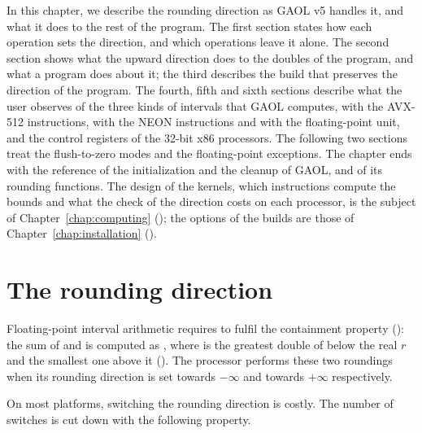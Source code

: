 \documentclass[12pt,a4paper,twoside,openright]{book}
\begin{document}
\medskip
In this chapter, we describe the rounding direction as GAOL v5 handles it,
and what it does to the rest of the program. The first section states how
each operation sets the direction, and which operations leave it alone. The
second section shows what the upward direction does to the doubles of the
program, and what a program does about it; the third describes the build that
preserves the direction of the program. The fourth, fifth and sixth sections
describe what the user observes of the three kinds of intervals that GAOL
computes, with the AVX-512 instructions, with the NEON instructions and with
the floating-point unit, and the control registers of the 32-bit x86
processors. The following two sections treat the flush-to-zero modes and the
floating-point exceptions. The chapter ends with the reference of the
initialization and the cleanup of GAOL, and of its rounding functions. The
design of the kernels, which instructions compute the bounds and what the
check of the direction costs on each processor, is the subject of
Chapter~\ref{chap:computing} (); the options of the builds
are those of Chapter~\ref{chap:installation} ().

\section{The rounding direction}\label{sec:rounding-direction}
%
%
%
%
%
%
%
%

Floating-point interval arithmetic requires  to fulfil
the containment property (): the sum of  and
 is computed as , where
 is the greatest double of \FSet{} below the real $r$ and
 the smallest one above it (). The
processor performs these two roundings when its rounding direction is set
towards $-\infty$ and towards $+\infty$ respectively.

\medskip
On most platforms, switching the rounding direction is costly. The number of
switches is cut down with the following property.
\end{document}

